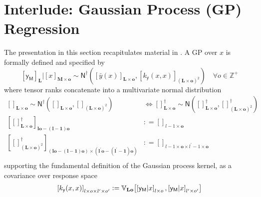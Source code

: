 \documentclass[preprint,12pt]{elsarticle}
\newcommand*{\M}[1]{\ensuremath{#1}\xspace}
\newcommand*{\x}{\times}
\newcommand*{\mi}[1]{\mathbf{#1}}
\newcommand*{\st}[1]{\mathbb{#1}}
\newcommand*{\rv}[1]{\mathsf{#1}}
\newcommand*{\te}[2][]{\left\lbrack{#2}\right\rbrack_{#1}}
\newcommand*{\deq}{\M{\mathrel{\mathop:}=}}
\newcommand*{\cov}[3][]{\ifthenelse{\equal{#1}{}}{\mathbb{V}_{#3}\!\left\lbrack{#2}\right\rbrack}{\mathbb{V}_{#3}\!\left\lbrack{#2,#1}\right\rbrack}}
\newcommand*{\gauss}[2]{\mathsf{N}\!\left({#1,#2}\right)}
\newcommand*{\gaussd}[2]{\mathsf{N}^{\dagger}\!\left({#1,#2}\right)}
\begin{document}
\section{Interlude: Gaussian Process (GP) Regression} \label{sec:GPR}
    The presentation in this section recapitulates material in \cite{Rasmussen.Williams2005, Alvarez.etal2011}. A GP over $x$ is formally defined and specified by
    \begin{equation*}
        \te[\mi{L}]{\rv{y_M}} \big\vert \te[\mi{M}\x\mi{o}]{x} \sim 
        \gaussd{\te[\mi{L}\x\mi{o}]{\bar{y}(x)}}{\te[(\mi{L}\x\mi{o})^{2}]
        {k_{\rv{y}}(x,x)}} \quad \forall o \in \st{Z^{+}}
    \end{equation*}
    where tensor ranks concatenate into a multivariate normal distribution
    \begin{equation*}
        \begin{aligned}
            \te[\mi{L}\x\mi{o}]{} \sim \gaussd{\te[\mi{L}\x\mi{o}]{}}{\te[(\mi{L\x o})^{2}]{}}
            & \Longleftrightarrow
            \te[\mi{L}\x\mi{o}]{}^{\dagger} \sim \gauss{\te[\mi{L}\x\mi{o}]{}^{\dagger}}{\te[(\mi{L\x o})^{2}]{}^{\dagger}} \\
            \te[\mi{lo}-\mi{(l-1)o}]{\te[\mi{L}\x\mi{o}]{}^{\dagger}} 
            &\deq \te[l-1\x\mi{o}]{} \\
            \te[(\mi{lo}-(\mi{l-1})\mi{o}) \x (\mi{l^{\prime}o}-\mi{(l^{\prime}-1)o})]
            {\te[(\mi{L\x o})^{2}]{}^{\dagger}} 
            &\deq \te[l-1\x\mi{o} \x l^{\prime}-1\x\mi{o}]{} \\
        \end{aligned}
    \end{equation*}
    supporting the fundamental definition of the Gaussian process kernel, as a covariance over response space
    \begin{equation*}
        \te[l\x o\x l^{\prime}\x o^{\prime}]{k_{\rv{y}}(x,x)} 
        \deq \cov[{\te[l^{\prime}\x o^{\prime}]{\rv{y_M}\vert x}}]{\te[l\x o]{\rv{y_M}\vert x}}{\mi{Lo}}
    \end{equation*}
\end{document}

